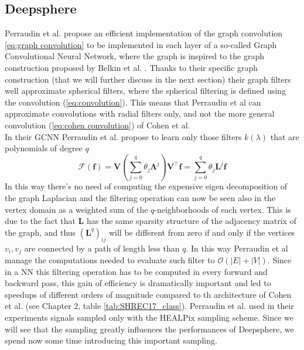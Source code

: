 \subsection{Deepsphere}\label{sec:Chapter1:DeepSphere}
Perraudin et al. propose an efficient implementation of the graph convolution \ref{eq:graph convolution} to be implemented in each layer of a so-called Graph Convolutional Neural Network, where the graph is inspired to the graph construction proposed by Belkin et al. \cite{Belkin:2005:TTF:2138147.2138189}. Thanks to their specific graph construction (that we will further discuss in the next section) their graph filters well approximate spherical filters, where the spherical filtering is defined using the convolution (\ref{eq:convolution}). This means that Perraudin et al can approximate convolutions with radial filters only, and not the more general convolution (\ref{eq:cohen convolution}) of Cohen et al.\\
In their GCNN Perraudin et al. propose to learn only those filters $k(\lambda)$ that are polynomials of degree $q$
\begin{equation}\label{deepsphere filter}
\mathcal F(\mathbf f) = \boldsymbol{V}\left(\sum_{j=0}^{q} \theta_{j} \boldsymbol{\Lambda}^{j}\right) \boldsymbol{V}^{\top} \boldsymbol{f}=\sum_{j=0}^{q} \theta_{j} \boldsymbol{L}^{j} \boldsymbol{f}
\end{equation}
In this way there's no need of computing the expensive eigen decomposition of the graph Laplacian and the filtering operation can now be seen also in the vertex domain as a weighted sum of the $q$-neighborhoods of each vertex. This is due to the fact that $\mathbf L $ has the same sparsity structure of the adjacency matrix of the graph, and thus $(\mathbf L^q)_{ij}$ will be different from zero if and only if the vertices $v_i, v_j$ are connected by a path of length less than $q$. In this way Perraudin et al manage the computations needed to evaluate such filter to $\mathcal O(|E|+|V|)$. Since in a NN this filtering operation has to be computed in every forward and backward pass, this gain of efficiency is dramatically important and led to speedups of different orders of magnitude compared to th architecture of Cohen et al. (see Chapter 2, table \ref{tab:SHREC17_class}). Perraudin et al. used in their experiments signals sampled only with the HEALPix sampling scheme. Since we will see that the sampling greatly influences the performances of Deepsphere, we spend now some time introducing this important sampling.
